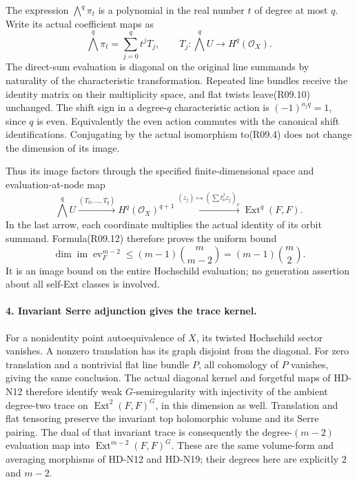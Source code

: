 The expression $\bigwedge^q\pi_t$ is a polynomial in the
real number $t$ of degree at most $q$. Write its actual
coefficient maps as
\[
   \bigwedge^q\pi_t=\sum_{j=0}^q t^jT_j,
       \qquad T_j:\bigwedge^qU\longrightarrow H^q(\mathcal O_X).
                                                               \tag{R09.11}
\]
The direct-sum evaluation is diagonal on the original line
summands by naturality of the characteristic transformation.
Repeated line bundles receive the identity matrix on their
multiplicity space, and flat twists leave(R09.10) unchanged.
The shift sign in a degree-$q$ characteristic action is
$(-1)^{a_jq}=1$, since $q$ is even. Equivalently the even
action commutes with the canonical shift identifications.
Conjugating by the actual isomorphism to(R09.4) does not
change the dimension of its image.

Thus its image factors through the specified finite-dimensional
space and evaluation-at-node map
\[
 \bigwedge^qU\xrightarrow{(T_0,\ldots,T_q)}
     H^q(\mathcal O_X)^{q+1}
       \xrightarrow{(z_j)\mapsto(\sum t_\nu^jz_j)_\nu}
               \operatorname{Ext}^q(F,F).                  \tag{R09.12}
\]
In the last arrow, each coordinate multiplies the actual
identity of its orbit summand. Formula(R09.12) therefore
proves the uniform bound
\[
       \dim\operatorname{im}\operatorname{ev}_F^{m-2}
                    \le(m-1)\binom m{m-2}
                     =(m-1)\binom m2.                       \tag{R09.13}
\]
It is an image bound on the entire Hochschild evaluation;
no generation assertion about all self-Ext classes is involved.

\paragraph{4. Invariant Serre adjunction gives the trace kernel.}
For a nonidentity point autoequivalence of $X$, its twisted
Hochschild sector vanishes. A nonzero translation has its
graph disjoint from the diagonal. For zero translation and
a nontrivial flat line bundle $P$, all cohomology of $P$
vanishes, giving the same conclusion. The actual diagonal
kernel and forgetful maps of HD-N12 therefore identify weak
$G$-semiregularity with injectivity of the ambient degree-two
trace on $\operatorname{Ext}^2(F,F)^G$, in this dimension
as well. Translation and flat tensoring preserve the invariant
top holomorphic volume and its Serre pairing. The dual of
that invariant trace is consequently the degree-$(m-2)$
evaluation map into $\operatorname{Ext}^{m-2}(F,F)^G$.
These are the same volume-form and averaging morphisms of
HD-N12 and HD-N19; their degrees here are explicitly $2$
and $m-2$.


